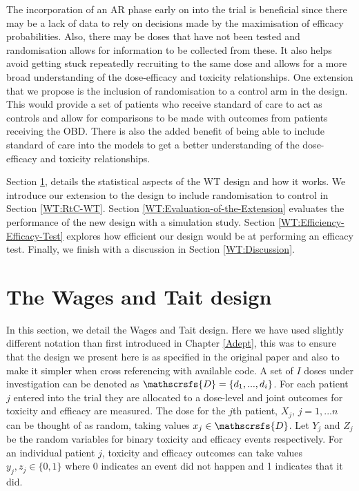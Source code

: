 The incorporation of an AR phase early on into the trial is beneficial since there may be a lack of data to rely on decisions made by the maximisation of efficacy probabilities. Also, there may be doses that have not been tested and randomisation allows for information to be collected from these. It also helps avoid getting stuck repeatedly recruiting to the same dose and allows for a more broad understanding of the dose-efficacy and toxicity relationships. One extension that we propose is the inclusion of randomisation to a control arm in the design. This would provide a set of patients who receive standard of care to act as controls and allow for comparisons to be made with outcomes from patients receiving the OBD. There is also the added benefit of being able to include standard of care into the models to get a better understanding of the dose-efficacy and toxicity relationships.  

Section \ref{WT:Wages-and-Tait-Design}, details the statistical aspects of the WT design and how it works. We introduce our extension to the design to include randomisation to control in Section \ref{WT:RtC-WT}. Section \ref{WT:Evaluation-of-the-Extension} evaluates the performance of the new design with a simulation study. Section \ref{WT:Efficiency-Efficacy-Test} explores how efficient our design would be at performing an efficacy test. Finally, we finish with a discussion in Section \ref{WT:Discussion}.  


\section{The Wages and Tait design}
\label{WT:Wages-and-Tait-Design}

In this section, we detail the Wages and Tait design. Here we have used slightly different notation than first introduced in Chapter \ref{Adept}, this was to ensure that the design we present here is as specified in the original paper \cite{wagesSeamlessPhaseII2015} and also to make it simpler when cross referencing with available code. A set of $I$ doses under investigation can be denoted as $\mathscrsfs{D} = \{d_1, ...,d_i\}$. For each patient $j$ entered into the trial they are allocated to a dose-level and joint outcomes for toxicity and efficacy are measured. The dose for the $j$th patient, $X_j$, $j = 1,...n$ can be thought of as random, taking values $x_j \in  \mathscrsfs{D}$. Let $Y_j$ and $Z_j$ be the random variables for binary toxicity and efficacy events respectively. For an individual patient $j$, toxicity and efficacy outcomes can take values $y_j, z_j \in \{0,1\}$ where 0 indicates an event did not happen and 1 indicates that it did. 

